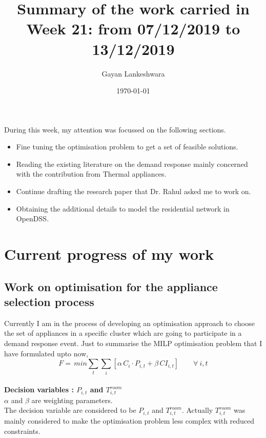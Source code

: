 \documentclass[12pt,a4paper]{article}
\title{\large\textbf{ Summary of the work carried in Week 21: from 07/12/2019 to 13/12/2019} }
\author{\small Gayan Lankeshwara}
\date{\small \today}
\begin{document}
\maketitle

During this week, my attention was focussed on the following sections.
\begin{itemize}
    \item Fine tuning the optimisation problem to get a set of feasible solutions.
    \item Reading the existing literature on the demand response mainly concerned with the contribution from Thermal appliances.
    \item Continue drafting the research paper that Dr. Rahul asked me to work on.
    \item Obtaining the additional details to model the residential network in OpenDSS.
\end{itemize}

\section*{\large Current progress of my work}

\subsection*{\small Work on optimisation for the appliance selection process}

Currently I am in the process of developing an optimisation approach to choose the set of appliances in a specific cluster which are going to participate in a demand response event. Just to summarise the MILP optimisation problem that I have formulated upto now,\\

\begin{equation}
    F =\, min \sum_{t} \sum_{i} [\alpha \, C_{i}\cdot P_{i,t} + \beta\, CI_{i,t}] \quad \quad \forall \: i,t
\end{equation}
\\
\textbf{Decision variables : $P_{i,t}$ and $T_{i,t}^{room}$}\\

\noindent $\alpha$ and $\beta$ are weighting parameters.\\

The decision variable are considered to be $P_{i,t}$ and $T_{i,t}^{room}$. Actually $T_{i,t}^{room}$ was mainly considered to make the optimisation problem less complex with reduced constraints.\\
\end{document}
